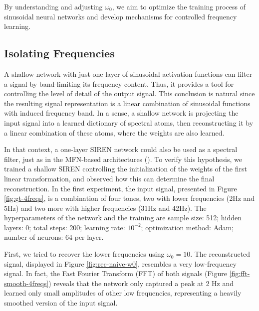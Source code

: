 By understanding and adjusting \(\omega_0\), we aim to optimize the training process of sinusoidal neural networks and develop mechanisms for controlled frequency learning.


\subsection{Isolating Frequencies}

A shallow network with just one layer of sinusoidal activation functions can filter a signal by band-limiting its frequency content. Thus, it provides a tool for controlling the level of detail of the output signal. This conclusion is natural since the resulting signal representation is a linear combination of sinusoidal functions with induced frequency band. In a sense, a shallow network is projecting the input signal into a learned dictionary of spectral atoms, then reconstructing it by a linear combination of these atoms, where the weights are also learned.

In that context, a one-layer SIREN network could also be used as a spectral filter, just as in the MFN-based architectures (\cite{fathony2020multiplicative}). To verify this hypothesis, we trained a shallow SIREN controlling the initialization of the weights of the first linear transformation, and observed how this can determine the final reconstruction. In the first experiment, the input signal, presented in Figure \ref{fig:gt-4freqs}, is a combination of four tones, two with lower frequencies (2Hz and 5Hz) and two more with higher frequencies (31Hz and 42Hz). The hyperparameters of the network and the training are sample size: 512; hidden layers: 0; total steps: 200; learning rate: $10^{-2}$; optimization method: Adam; number of neurons: 64 per layer. 

First, we tried to recover the lower frequencies using $\omega_0=10$. The reconstructed signal, displayed in Figure \ref{fig:rec-naive-w0}, resembles a very low-frequency signal. In fact, the Fast Fourier Transform (FFT) of both signals (Figure \ref{fig:fft-smooth-4freqs}) reveals that the network only captured a peak at 2 Hz and learned only small amplitudes of other low frequencies, representing a heavily smoothed version of the input signal.

